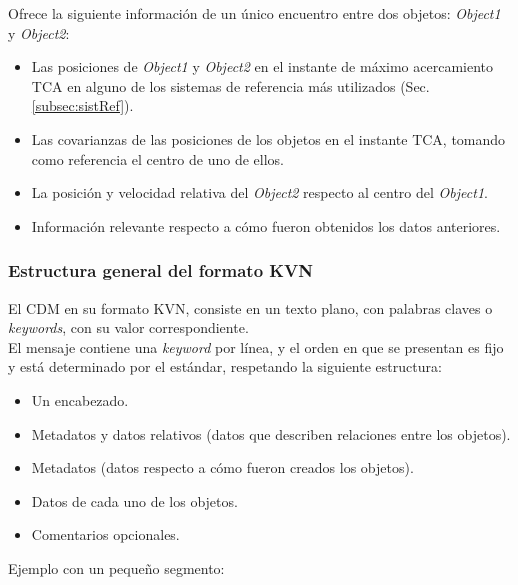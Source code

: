 Ofrece la siguiente informaci\'on de un \'unico encuentro entre dos objetos: {\it{Object1}} y {\it{Object2}}:
\begin{itemize}
\item Las posiciones de  {\it{Object1}} y  {\it{Object2}} en el instante de m\'aximo acercamiento TCA en alguno de los sistemas de referencia m\'as utilizados (Sec. \ref{subsec:sistRef}).
\item Las covarianzas de las posiciones de los objetos en el instante TCA, tomando como referencia el centro de uno de ellos.
\item La posici\'on y velocidad relativa del {\it{Object2}} respecto al centro del {\it{Object1}}.
\item Informaci\'on relevante respecto a c\'omo fueron obtenidos los datos anteriores.
\end{itemize}


\subsubsection*{Estructura general del formato KVN}
El CDM en su formato KVN, consiste en un texto plano, con palabras claves o {\it{keywords}}, con su valor correspondiente.\\
El mensaje contiene una {\it{keyword}} por l\'inea, y el orden en que se presentan es fijo y est\'a determinado por el est\'andar, respetando la siguiente estructura:

\begin{itemize}
\itemsep0em
\item Un encabezado.
\item Metadatos y datos relativos (datos que describen relaciones entre los objetos).
\item Metadatos (datos respecto a c\'omo fueron creados los objetos).
\item Datos de cada uno de los objetos.
\item Comentarios opcionales.
\end{itemize}

Ejemplo con un peque\~no segmento:\\



